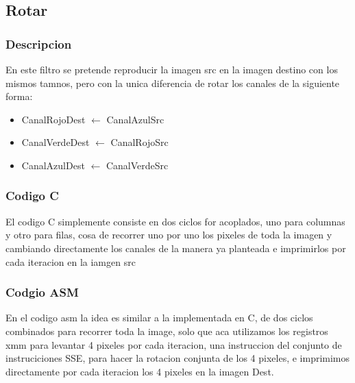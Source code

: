 \subsection{Rotar}
\subsubsection{Descripcion}
En este filtro se pretende reproducir la imagen src en la imagen destino con los mismos tamnos, pero con la unica diferencia de rotar los canales de la siguiente forma:
\begin{itemize}
\item {CanalRojoDest $\leftarrow$ CanalAzulSrc}
\item {CanalVerdeDest $\leftarrow$ CanalRojoSrc}
\item {CanalAzulDest $\leftarrow$ CanalVerdeSrc} 
\end{itemize}

\subsubsection{Codigo C}
El codigo C simplemente consiste en dos ciclos for acoplados, uno para columnas y otro para filas, cosa de recorrer uno por uno los pixeles de toda la imagen y cambiando directamente los canales de la manera ya planteada e imprimirlos por cada iteracion en la iamgen src

\subsubsection{Codgio ASM}
En el codigo asm la idea es similar a la implementada en C, de dos ciclos combinados para recorrer toda la image,  solo que aca utilizamos los registros xmm para levantar 4 pixeles por cada iteracion, una instruccion del conjunto de instruciciones SSE, para hacer la rotacion conjunta de los 4 pixeles, e imprimimos directamente por cada iteracion los 4 pixeles en la imagen Dest.
